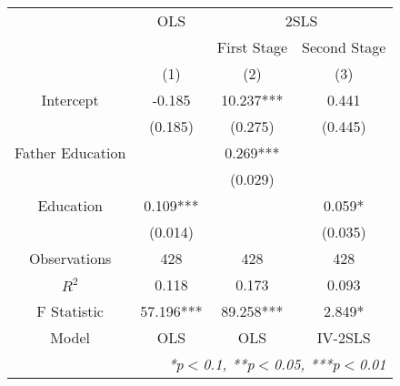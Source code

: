 \begin{tabular}{cccc}
  \toprule
  \toprule
   & \multicolumn{1}{c}{OLS} & \multicolumn{2}{c}{2SLS} \\
   & \multicolumn{1}{c}{} & \multicolumn{1}{c}{First Stage} & \multicolumn{1}{c}{Second Stage} \\
   & (1) & (2) & (3)\\
  \midrule
  Intercept & -0.185 & 10.237*** & 0.441 \\
   & (0.185) & (0.275) & (0.445) \\
  Father Education &  & 0.269*** &  \\
   &  & (0.029) &  \\
  Education & 0.109*** &  & 0.059* \\
   & (0.014) &  & (0.035) \\
  \midrule
  Observations & 428 & 428 & 428 \\
  $R^2$ & 0.118 & 0.173 & 0.093 \\
  F Statistic & 57.196*** & 89.258*** & 2.849* \\
  Model & OLS & OLS & IV-2SLS \\
  \bottomrule
  \multicolumn{4}{r}{{\small \textit{*p$<$0.1, **p$<$0.05, ***p$<$0.01}}}\\
\end{tabular}
